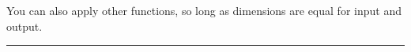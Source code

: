 You can also apply other functions, so long as dimensions are equal for
input and output.

\begin{Shaded}
\begin{Highlighting}[]

\OperatorTok{=}\NormalTok{, }\OperatorTok{=}\NormalTok{)}
\OperatorTok{=}
\end{Highlighting}
\end{Shaded}

\begin{center}\rule{0.5\linewidth}{\linethickness}\end{center}
